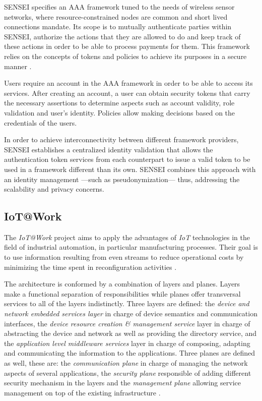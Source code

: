 \documentclass[journal]{IEEEtran}
\begin{document}
  SENSEI specifies an AAA framework tuned to the needs of wireless sensor networks, where resource-constrained nodes are common and short lived connections mandate. Its scope is to mutually authenticate parties within SENSEI, authorize the actions that they are allowed to do and keep track of these actions in order to be able to process payments for them. This framework relies on the concepts of tokens and policies to achieve its purposes in a secure manner \cite{Bauge2010}.

  Users require an account in the AAA framework in order to be able to access its services. After creating an account, a user can obtain security tokens that carry the necessary assertions to determine aspects such as account validity, role validation and user's identity. Policies allow making decisions based on the credentials of the users.

  In order to achieve interconnectivity between different framework providers, SENSEI establishes a centralized identity validation that allows the authentication token services from each counterpart to issue a valid token to be used in a framework different than its own. SENSEI combines this approach with an identity management ---such as pseudonymization--- thus, addressing the scalability and privacy concerns. 

  \subsection{IoT@Work}

  The \emph{IoT@Work} project aims to apply the advantages of \emph{IoT} technologies in the field of industrial automation, in particular manufacturing processes. Their goal is to use information resulting from even streams to reduce operational costs by minimizing the time spent in reconfiguration activities \cite{IoTWorkWeb}.

  The architecture is conformed by a combination of layers and planes. Layers make a functional separation of responsibilities while planes offer transversal services to all of the layers indistinctly. Three layers are defined: the \emph{device and network embedded services layer} in charge of device semantics and communication interfaces, the \emph{device resource creation \& management service} layer in charge of abstracting the device and network as well as providing the directory service, and the \emph{application level middleware services} layer in charge of composing, adapting and communicating the information to the applications. Three planes are defined as well, these are: the \emph{communication plane} in charge of managing the network aspects of several applications, the \emph{security plane} responsible of adding different security mechanism in the layers and the \emph{management plane} allowing service management on top of the existing infrastructure \cite{Rotondi2013}.
\end{document}
